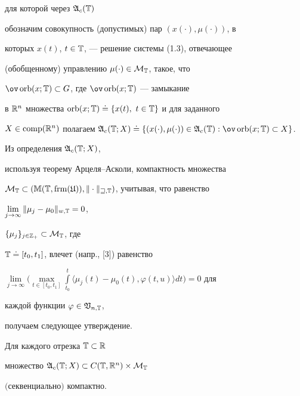 для которой через $\frak A_c(\Bbb T)$


обозначим совокупность (допустимых) пар $(x(\cdot),\mu(\cdot))$, в


которых $x(t)$, $t\in\Bbb T$, --- решение системы (1.3), отвечающее


(обобщенному) управлению $\mu(\cdot)\in\cal M_{\Bbb T}$, такое, что


$\ov\orb(x;\Bbb T)\subset G$, где $\ov\orb(x;\Bbb T)$ --- замыкание


в $\Bbb R^n$ множества $\orb(x;\Bbb T)


\doteq\{x(t),\ t\in\Bbb T\}$ и для заданного


$X\in\comp(\Bbb R^n)$ полагаем $\frak A_c(\Bbb T;X)\doteq


\{(x(\cdot),\mu(\cdot))\in\frak A_c(\Bbb T):


\ov\orb(x;\Bbb T)\subset X\}$.





Из определения $\frak A_c(\Bbb T;X)$,


используя теорему Арцеля--Асколи, компактность множества


$\cal M_{\Bbb T}\subset(\Bbb M(\Bbb T,\frm(\frak U)),


\|\cdot\|_{w,\Bbb T})$, учитывая, что равенство


$\lim\limits_{j\to\infty}\|\mu_j - \mu_0\|_{w,\Bbb T}=0$,


$\{\mu_j\}_{j\in\Bbb Z_+}\subset\cal M_{\Bbb T}$, где


$\Bbb T\doteq[t_0,t_1]$, влечет (напр., [3]) равенство


$\lim\limits_{j\to\infty}\Big(\max\limits_{t\in[t_0,t_1]}\int\limits_{t_0}^t


\langle\mu_j(t)-\mu_0(t),\varphi(t,u)\rangle dt\Big)=0$ для


каждой функции $\varphi\in\frak V_{n,\Bbb T}$,


получаем следующее утверждение.








\begin{lems} 


Для каждого отрезка $\Bbb T\subset\Bbb R$


множество $\frak A_c(\Bbb T;X)


\subset C(\Bbb T,\Bbb R^n)\times\cal M_{\Bbb T}$


$($сек\-вен\-ци\-аль\-но\/$)$ компактно.


\end{lems}





